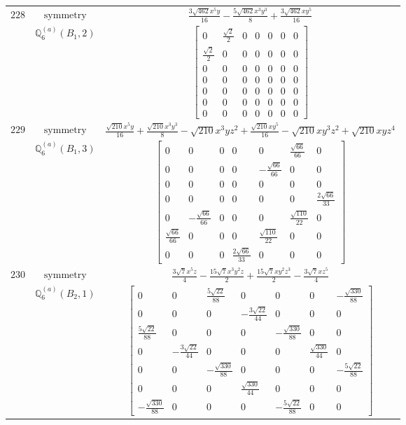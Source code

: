 \documentclass[fleqn,8pt,landscape]{jsarticle}
\begin{document}
\begin{longtable}{ccc}
$ 228 $ & $ \text{symmetry} $ & $ \frac{3 \sqrt{462} x^{5} y}{16} - \frac{5 \sqrt{462} x^{3} y^{3}}{8} + \frac{3 \sqrt{462} x y^{5}}{16} $ \\
$  $ & $ \mathbb{Q}_{6}^{(a)}(B_{1},2) $ & $ \begin{bmatrix} 0 & \frac{\sqrt{2}}{2} & 0 & 0 & 0 & 0 & 0 \\ \frac{\sqrt{2}}{2} & 0 & 0 & 0 & 0 & 0 & 0 \\ 0 & 0 & 0 & 0 & 0 & 0 & 0 \\ 0 & 0 & 0 & 0 & 0 & 0 & 0 \\ 0 & 0 & 0 & 0 & 0 & 0 & 0 \\ 0 & 0 & 0 & 0 & 0 & 0 & 0 \\ 0 & 0 & 0 & 0 & 0 & 0 & 0 \end{bmatrix} $ \\ \hline
$ 229 $ & $ \text{symmetry} $ & $ \frac{\sqrt{210} x^{5} y}{16} + \frac{\sqrt{210} x^{3} y^{3}}{8} - \sqrt{210} x^{3} y z^{2} + \frac{\sqrt{210} x y^{5}}{16} - \sqrt{210} x y^{3} z^{2} + \sqrt{210} x y z^{4} $ \\
$  $ & $ \mathbb{Q}_{6}^{(a)}(B_{1},3) $ & $ \begin{bmatrix} 0 & 0 & 0 & 0 & 0 & \frac{\sqrt{66}}{66} & 0 \\ 0 & 0 & 0 & 0 & - \frac{\sqrt{66}}{66} & 0 & 0 \\ 0 & 0 & 0 & 0 & 0 & 0 & 0 \\ 0 & 0 & 0 & 0 & 0 & 0 & \frac{2 \sqrt{66}}{33} \\ 0 & - \frac{\sqrt{66}}{66} & 0 & 0 & 0 & \frac{\sqrt{110}}{22} & 0 \\ \frac{\sqrt{66}}{66} & 0 & 0 & 0 & \frac{\sqrt{110}}{22} & 0 & 0 \\ 0 & 0 & 0 & \frac{2 \sqrt{66}}{33} & 0 & 0 & 0 \end{bmatrix} $ \\ \hline
$ 230 $ & $ \text{symmetry} $ & $ \frac{3 \sqrt{7} x^{5} z}{4} - \frac{15 \sqrt{7} x^{3} y^{2} z}{2} + \frac{15 \sqrt{7} x y^{2} z^{3}}{2} - \frac{3 \sqrt{7} x z^{5}}{4} $ \\
$  $ & $ \mathbb{Q}_{6}^{(a)}(B_{2},1) $ & $ \begin{bmatrix} 0 & 0 & \frac{5 \sqrt{22}}{88} & 0 & 0 & 0 & - \frac{\sqrt{330}}{88} \\ 0 & 0 & 0 & - \frac{3 \sqrt{22}}{44} & 0 & 0 & 0 \\ \frac{5 \sqrt{22}}{88} & 0 & 0 & 0 & - \frac{\sqrt{330}}{88} & 0 & 0 \\ 0 & - \frac{3 \sqrt{22}}{44} & 0 & 0 & 0 & \frac{\sqrt{330}}{44} & 0 \\ 0 & 0 & - \frac{\sqrt{330}}{88} & 0 & 0 & 0 & - \frac{5 \sqrt{22}}{88} \\ 0 & 0 & 0 & \frac{\sqrt{330}}{44} & 0 & 0 & 0 \\ - \frac{\sqrt{330}}{88} & 0 & 0 & 0 & - \frac{5 \sqrt{22}}{88} & 0 & 0 \end{bmatrix} $ \\ \hline

\end{longtable}
\end{document}
